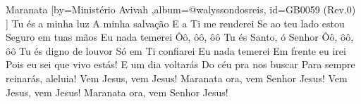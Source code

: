 \beginsong
{Maranata %
}[by={Ministério Avivah %
},album={@walyssondosreis},
id={GB0059 %
(Rev.0) %
}]
\beginverse*
Tu és a minha luz
A minha salvação
E a Ti me renderei
Se ao teu lado estou
Seguro em tuas mãos
Eu nada temerei
\endverse
\beginverse*
Ôô, ôô, ôô
Tu és Santo, ó Senhor
Ôô, ôô, ôô
Tu és digno de louvor
\endverse
\beginchorus
Só em Ti confiarei
Eu nada temerei
Em frente eu irei
Pois eu sei que vivo estás!
E um dia voltarás
Do céu pra nos buscar
Para sempre reinarás, aleluia!
\endchorus
\beginverse*
Vem Jesus, vem Jesus!
Maranata ora, vem Senhor Jesus!
Vem Jesus, vem Jesus!
Maranata ora, vem Senhor Jesus!
\endverse

